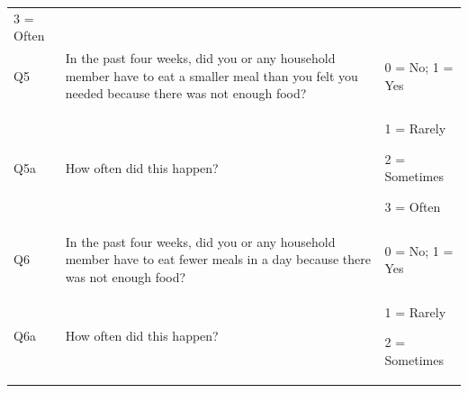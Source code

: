 \documentclass[12pt,]{book}
\theoremstyle{definition}
\theoremstyle{definition}
\theoremstyle{definition}
\theoremstyle{remark}
\begin{document}
\begin{longtable}[]{@{}lll@{}}
\begin{minipage}[t]{0.32\columnwidth}
3 = Often\strut
\end{minipage}\tabularnewline
\begin{minipage}[t]{0.07\columnwidth}\raggedright
Q5\strut
\end{minipage} & \begin{minipage}[t]{0.62\columnwidth}\raggedright
In the past four weeks, did you or any household member have to eat a
smaller meal than you felt you needed because there was not enough
food?\strut
\end{minipage} & \begin{minipage}[t]{0.22\columnwidth}\raggedright
0 = No; 1 = Yes\strut
\end{minipage}\tabularnewline
\begin{minipage}[t]{0.32\columnwidth}\raggedright
Q5a\strut
\end{minipage} & \begin{minipage}[t]{0.32\columnwidth}\raggedright
How often did this happen?\strut
\end{minipage} & \begin{minipage}[t]{0.32\columnwidth}\raggedright
1 = Rarely

2 = Sometimes

3 = Often\strut
\end{minipage}\tabularnewline
\begin{minipage}[t]{0.07\columnwidth}\raggedright
Q6\strut
\end{minipage} & \begin{minipage}[t]{0.62\columnwidth}\raggedright
In the past four weeks, did you or any household member have to eat
fewer meals in a day because there was not enough food?\strut
\end{minipage} & \begin{minipage}[t]{0.22\columnwidth}\raggedright
0 = No; 1 = Yes\strut
\end{minipage}\tabularnewline
\begin{minipage}[t]{0.32\columnwidth}\raggedright
Q6a\strut
\end{minipage} & \begin{minipage}[t]{0.32\columnwidth}\raggedright
How often did this happen?\strut
\end{minipage} & \begin{minipage}[t]{0.32\columnwidth}\raggedright
1 = Rarely

2 = Sometimes


\end{minipage}
\end{longtable}
\end{document}
